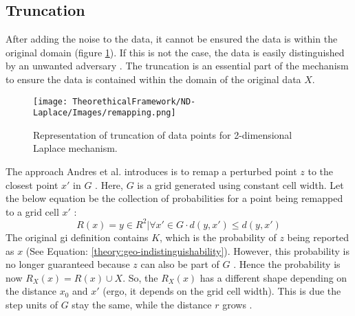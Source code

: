 \subsection{Truncation} \label{theory:truncation}
After adding the noise to the data, it cannot be ensured the data is within the original domain (figure \ref{figure:truncation-2d}).
If this is not the case, the data is easily distinguished by an unwanted adversary \citep{DBLP:journals/corr/abs-1212-1984,9646489}.
The truncation is an essential part of the mechanism to ensure the data is contained within the domain of the original data $X$.
\begin{figure}[H]
  \texttt{[image: TheorethicalFramework/ND-Laplace/Images/remapping.png]}
  \caption{Representation of truncation of data points for 2-dimensional Laplace mechanism.}
  \label{figure:truncation-2d}
\end{figure}
The approach Andres et al. introduces is to remap a perturbed point $z$ to the closest point $x'$ in $G$ \citep{DBLP:journals/corr/abs-1212-1984}.
Here, $G$ is a grid generated using constant cell width.
Let the below equation be the collection of probabilities for a point being remapped to a grid cell $x'$ \citep{DBLP:journals/corr/abs-1212-1984}:
\begin{equation}
  R(x) = { y \in R^2 | \forall x' \in G \cdot d(y, x') \leq d(y, x')}
  \label{eq:grid-probability}
\end{equation}
The original \gls{gi} definition contains $K$, which is the probability of $z$ being reported as $x$ (See Equation: \ref{theory:geo-indistinguishability}).
However, this probability is no longer guaranteed because $z$ can also be part of $G$ \citep{DBLP:journals/corr/abs-1212-1984}.
Hence the probability is now $R_X(x) = R(x) \cup X$. \newline
So, the $R_X(x)$ has a different shape depending on the distance $x_0$ and $x'$ (ergo, it depends on the grid cell width). This is due the step units of $G$ stay the same, while the distance $r$ grows \citep{DBLP:journals/corr/abs-1212-1984}.
